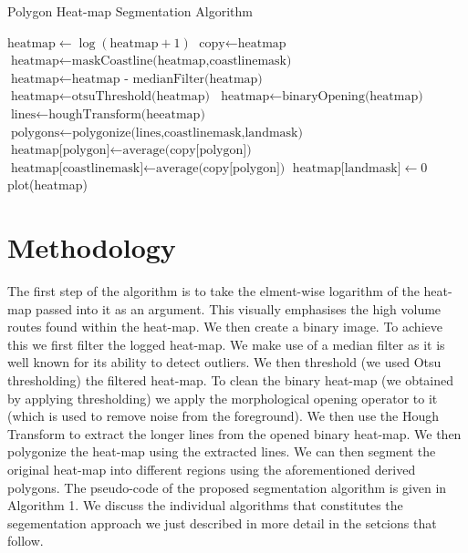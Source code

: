 \documentclass{article}
\begin{document}
\begin{algorithm}
 \caption{Polygon Heat-map Segmentation Algorithm}\label{euclid}
 \begin{algorithmic}[1]
 \State $\textrm{heatmap} \gets \log(\textrm{heatmap}+1)$
 \State $\textrm{copy} \gets \textrm{heatmap}$
 \State $\textrm{heatmap} \gets \textrm{maskCoastline(heatmap,coastlinemask)}$
 \State $\textrm{heatmap} \gets \textrm{heatmap - medianFilter(heatmap)}$ 
 \State $\textrm{heatmap} \gets \textrm{otsuThreshold(heatmap)}$
 \State $\textrm{heatmap} \gets \textrm{binaryOpening(heatmap)}$
 \State $\textrm{lines} \gets \textrm{houghTransform(heeatmap)}$
 \State $\textrm{polygons} \gets \textrm{polygonize(lines,coastlinemask,landmask)}$
     \State $\textrm{heatmap[polygon]} \gets \textrm{average(copy[polygon])}$ 
 \EndFor
 \State $\textrm{heatmap[coastlinemask]} \gets \textrm{average(copy[polygon])}$
 \State $\textrm{heatmap[landmask]} \gets 0$
 \State plot(heatmap)
 
 \EndProcedure
 \end{algorithmic}
 \end{algorithm}
\section{Methodology}
The first step of the algorithm is to take the elment-wise logarithm of the heat-map passed into it as an argument. This visually emphasises the high volume routes found within the heat-map. We then 
create a binary image. To achieve this we first filter the logged heat-map. We make use of a median filter as it is well known for its ability to detect outliers. We then threshold (we used Otsu thresholding) the  
filtered heat-map. To clean the binary heat-map (we obtained by applying thresholding) we apply the morphological opening operator to it (which is used to remove noise from the foreground).
We then use the Hough Transform to extract the longer lines from the opened binary heat-map. We then polygonize the heat-map using the extracted lines. We can then 
segment the original heat-map into different regions using the aforementioned derived polygons. The pseudo-code of the proposed segmentation algorithm is given in Algorithm 1. We discuss the individual algorithms that constitutes the segementation approach we 
just described in more detail in the setcions that follow.  
\end{document}
